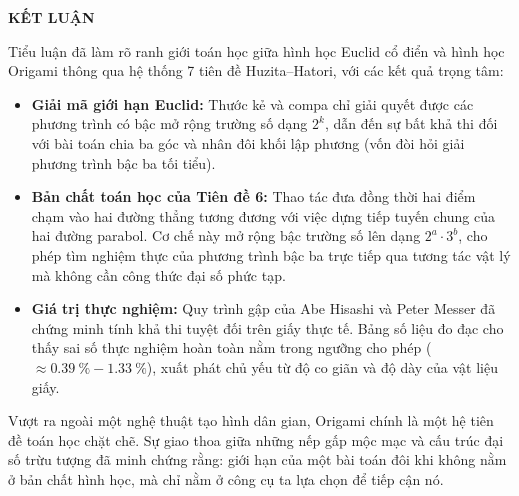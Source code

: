 \begin{center}
{{\bf\fontsize{14pt}{14.5pt}\selectfont 
KẾT LUẬN}}
\end{center}

Tiểu luận đã làm rõ ranh giới toán học giữa hình học Euclid cổ điển và hình học Origami thông qua hệ thống 7 tiên đề Huzita--Hatori, với các kết quả trọng tâm:

\begin{itemize}
    \item \textbf{Giải mã giới hạn Euclid:} Thước kẻ và compa chỉ giải quyết được các phương trình có bậc mở rộng trường số dạng $2^k$, dẫn đến sự bất khả thi đối với bài toán chia ba góc và nhân đôi khối lập phương (vốn đòi hỏi giải phương trình bậc ba tối tiểu).
    \item \textbf{Bản chất toán học của Tiên đề 6:} Thao tác đưa đồng thời hai điểm chạm vào hai đường thẳng tương đương với việc dựng tiếp tuyến chung của hai đường parabol. Cơ chế này mở rộng bậc trường số lên dạng $2^a \cdot 3^b$, cho phép tìm nghiệm thực của phương trình bậc ba trực tiếp qua tương tác vật lý mà không cần công thức đại số phức tạp.
    \item \textbf{Giá trị thực nghiệm:} Quy trình gập của Abe Hisashi và Peter Messer đã chứng minh tính khả thi tuyệt đối trên giấy thực tế. Bảng số liệu đo đạc cho thấy sai số thực nghiệm hoàn toàn nằm trong ngưỡng cho phép ($\approx \SI{0.39}{\percent} - \SI{1.33}{\percent}$), xuất phát chủ yếu từ độ co giãn và độ dày của vật liệu giấy.
\end{itemize}

Vượt ra ngoài một nghệ thuật tạo hình dân gian, Origami chính là một hệ tiên đề toán học chặt chẽ. Sự giao thoa giữa những nếp gấp mộc mạc và cấu trúc đại số trừu tượng đã minh chứng rằng: giới hạn của một bài toán đôi khi không nằm ở bản chất hình học, mà chỉ nằm ở công cụ ta lựa chọn để tiếp cận nó.